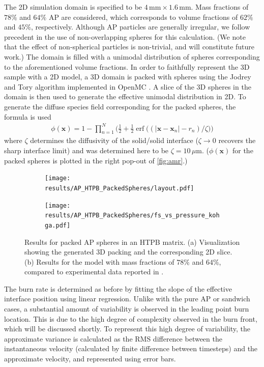 \documentclass[colorinlistoftodos,review]{elsarticle}
\begin{document}
The 2D simulation domain is specified to be $4\,\mathrm{mm} \times 1.6\,\mathrm{mm}$.
Mass fractions of $78\%$ and $64\%$ AP are considered, which corresponds to volume fractions of $62\%$ and $45\%$, respectively.
Although AP particles are generally irregular, we follow precedent \cite{dennis2019combustion} in the use of non-overlapping spheres for this calculation.
(We note that the effect of non-spherical particles is non-trivial, and will constitute future work.)
The domain is filled with a unimodal distribution of spheres corresponding to the aforementioned volume fractions.
In order to faithfully represent the 3D sample with a 2D model, a 3D domain is packed with spheres using the Jodrey and Tory algorithm \cite{jodrey1985computer} implemented in OpenMC \cite{romano2015openmc}.
A slice of the 3D spheres in the domain is then used to generate the effective unimodal distribution in 2D.
To generate the diffuse species field corresponding for the packed spheres, the formula is used
\begin{align}
  \phi(\bm{x}) = 1 - \prod_{n=1}^N\Bigg(\frac{1}{2} + \frac{1}{2}\operatorname{erf}\Big((|\bm{x}-\bm{x}_n| - r_n)/\zeta\Big)\Bigg)
\end{align}
where $\zeta$ determines the diffusivity of the solid\slash solid interface ($\zeta\to0$ recovers the sharp interface limit) and was determined here to be $\zeta=10\,\mu\mathrm{m}$.
($\phi(\bm{x})$ for the packed spheres is plotted in the right pop-out of \cref{fig:amr}.)

\begin{figure}
  \centering
  \begin{subfigure}{0.5\linewidth}\centering
    \texttt{[image: results/AP\_HTPB\_PackedSpheres/layout.pdf]}\hfill
    \caption{}
    \label{fig:packedspheres_layout}
  \end{subfigure}%
  \begin{subfigure}{0.5\linewidth}\centering
    \texttt{[image: results/AP\_HTPB\_PackedSpheres/fs\_vs\_pressure\_kohga.pdf]}
    \caption{}
    \label{fig:packedspheres_fs_vs_pressure}
  \end{subfigure}
  \caption{
    Results for packed AP spheres in an HTPB matrix.
    (a) Visualization showing the generated 3D packing and the corresponding 2D slice.
    (b) Results for the model with mass fractions of $78\%$ and $64\%$, compared to experimental data reported in \cite{kohga2011burning}.}
\end{figure}

The burn rate is determined as before by fitting the slope of the effective interface position using linear regression. 
Unlike with the pure AP or sandwich cases, a substantial amount of variability is observed in the leading point burn location.
This is due to the high degree of complexity observed in the burn front, which will be discussed shortly.
To represent this high degree of variability, the approximate variance is calculated as the RMS difference between the instantaneous velocity (calculated by finite difference between timesteps) and the approximate velocity, and represented using error bars.
\end{document}
